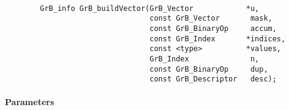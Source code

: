 \paragraph{\syntax}

\begin{verbatim}
        GrB_info GrB_buildVector(GrB_Vector            *u,
                                 const GrB_Vector       mask,
                                 const GrB_BinaryOp     accum,
                                 const GrB_Index       *indices,
                                 const <type>          *values,
                                 GrB_Index              n,
                                 const GrB_BinaryOp     dup,
                                 const GrB_Descriptor   desc);
\end{verbatim}

\paragraph{Parameters}

